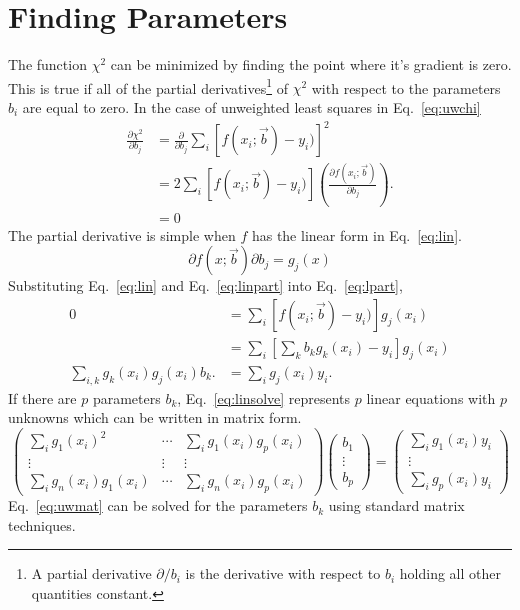 \documentclass{scrartcl}
\begin{document}
\section{Finding Parameters}
The function $\chi^2$ can be minimized by finding the point
where it's gradient is zero.
This is true if all of the partial derivatives\footnote{A
partial derivative $\partial/b_i$ is the derivative with respect
to $b_i$ holding all other quantities constant.}
of $\chi^2$ with
respect to the parameters $b_i$ are equal to zero. In the case 
of unweighted least squares in Eq.~\ref{eq:uwchi}
\begin{align}
\frac{\partial \chi^2}{\partial b_j} &= \frac{\partial}{\partial b_j}
\sum_i [f(x_i;\vec{b})-y_i)]^2\\
	&= 2\sum_i [f(x_i;\vec{b})-y_i)]
		\left(\frac{\partial f(x_i;\vec{b})}{\partial b_j}\right).
		\label{eq:lpart}\\
	&= 0
\end{align}
The partial derivative is simple when $f$ has the linear form
in Eq.~\ref{eq:lin}.
\begin{equation}
\partial{f(x;\vec{b})}{\partial b_j} = g_j(x)\label{eq:linpart}
\end{equation}
Substituting Eq.~\ref{eq:lin} and Eq.~\ref{eq:linpart} into
Eq.~\ref{eq:lpart},
\begin{align}
0 &= \sum_i [f(x_i;\vec{b})-y_i)]g_j(x_i)\\
	&= \sum_i \left[\sum_k b_k g_k(x_i)-y_i\right]g_j(x_i)\\
	\sum_{i,k} g_k(x_i)g_j(x_i)b_k.&= \sum_i g_j(x_i)y_i.\label{eq:linsolve}
\end{align}
If there are $p$ parameters $b_k$, Eq.~\ref{eq:linsolve} represents
$p$ linear equations with $p$ unknowns which can be written in
matrix form.
\begin{equation}
\left(\begin{array}{ccc}
\sum_i g_1(x_i)^2&\cdots&\sum_i g_1(x_i)g_p(x_i)\\
\vdots&\vdots&\vdots\\
\sum_i g_n(x_i)g_1(x_i)&\cdots&\sum_i g_n(x_i)g_p(x_i)
\end{array}\right)
\left(\begin{array}{c}
b_1\\
\vdots\\
b_p
\end{array}\right) =
\left(\begin{array}{c}
\sum_i g_1(x_i)y_i\\
\vdots\\
\sum_i g_p(x_i)y_i
\end{array}\right)\label{eq:uwmat}
\end{equation}
Eq.~\ref{eq:uwmat} can be solved for the parameters $b_k$
using standard matrix techniques.
\end{document}
